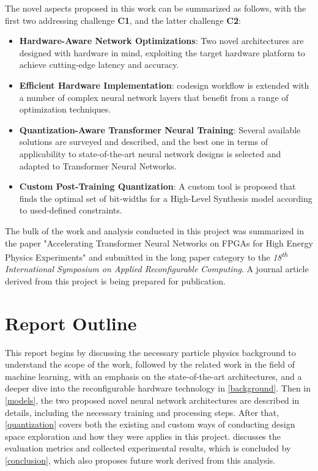 The novel aspects proposed in this work can be summarized as follows, with the first two addressing challenge \textbf{C1}, and the latter challenge \textbf{C2}:

\begin{itemize}
  \item \textbf{Hardware-Aware Network Optimizations}: Two novel architectures are designed with hardware in mind, exploiting the target hardware platform to achieve cutting-edge latency and accuracy.
  
  \item \textbf{Efficient Hardware Implementation}: \hlsml codesign workflow is extended with a number of complex neural network layers that benefit from a range of optimization techniques.
  
  \item \textbf{Quantization-Aware Transformer Neural Training}: Several available solutions are surveyed and described, and the best one in terms of applicability to state-of-the-art neural network designs is selected and adapted to Transformer Neural Networks.
  
  \item \textbf{Custom Post-Training Quantization}: A custom tool is proposed that finds the optimal set of bit-widths for a High-Level Synthesis model according to used-defined constraints.
\end{itemize}

The bulk of the work and analysis conducted in this project was summarized in the paper "Accelerating Transformer Neural Networks on FPGAs for High Energy Physics Experiments" and submitted in the long paper category to the \textit{18\textsuperscript{th} International Symposium on Applied Reconfigurable Computing}. A journal article derived from this project is being prepared for publication.

\section{Report Outline}
This report begins by discussing the necessary particle physics background to understand the scope of the work, followed by the related work in the field of machine learning, with an emphasis on the state-of-the-art architectures, and a deeper dive into the reconfigurable hardware technology in \cref{background}. Then in \cref{models}, the two proposed novel neural network architectures are described in details, including the necessary training and processing steps. After that, \cref{quantization} covers both the existing and custom ways of conducting design space exploration and how they were applies in this project.  discusses the evaluation metrics and collected experimental results, which is concluded by \cref{conclusion}, which also proposes future work derived from this analysis. 
